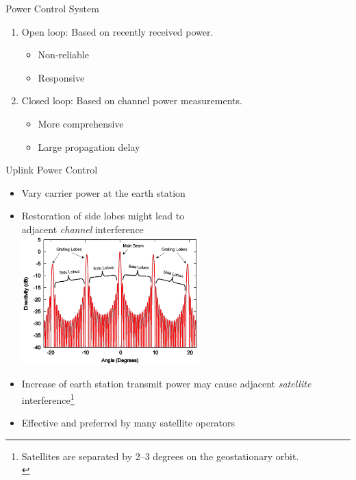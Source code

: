 \documentclass[pdf]{beamer}
\begin{document}
\begin{frame}{Power Control System}
  \begin{enumerate}\large
    \item Open loop: Based on recently received power.
      \begin{itemize}\large
        \item Non-reliable
        \item Responsive
      \end{itemize}
    \item Closed loop: Based on channel power measurements.
      \begin{itemize}\large
        \item More comprehensive
        \item Large propagation delay
      \end{itemize}
  \end{enumerate}
\end{frame}

\begin{frame}{Uplink Power Control}
  \begin{itemize}
    \item Vary carrier power at the earth station
    \item Restoration of side lobes might lead to\\
      adjacent \emph{channel} interference\\
      \includegraphics[width=0.54\textwidth]{lobes.png}
    \item Increase of earth station transmit power may cause
      adjacent \emph{satellite} interference\footnote{Satellites
      are separated by 2--3 degrees on the geostationary orbit.\\}
    \item Effective and preferred by many satellite operators
  \end{itemize}
\end{frame}
\end{document}
